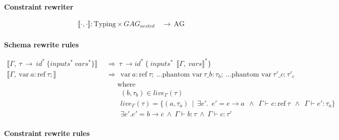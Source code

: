 
\begin{figure*}

\begin{center}

\textbf{Constraint rewriter}

\begin{align*}
\llbracket \cdot, \cdot \rrbracket : \text{Typing} \times GAG_{nested} & ~~\rightarrow~~ \text{AG}\\
\end{align*}

\textbf{Schema rewrite rules}

\begin{align*}
\llbracket \Gamma, ~\tau~ \rightarrow ~ id^{*} ~ \{ inputs^{*} ~ vars^{*} \}\rrbracket & ~~ \Rightarrow ~ \tau ~ \rightarrow id^{*} ~  \{  ~inputs^{*} ~ ~\llbracket \Gamma, ~ vars \rrbracket^{*}\} \\
\llbracket \Gamma, ~ \text{var} ~ a : \text{ref} ~ \tau;\rrbracket & ~~ \Rightarrow ~~
\text{var} ~ a : \text{ref} ~ \tau;  ~\ldots \text{phantom var} ~ \tau\_b : \tau_b; ~ \ldots \text{phantom var}~ \tau'\_c : \tau'_c \\
& ~~~~~~~ ~~\text{where} \\
& ~~~~~~~ ~~~~ (b,\tau_b) \in live_\Gamma(\tau) \\
& ~~~~~~~ ~~~~ live_{\Gamma}(\tau) = \{ (a, \tau_a) ~~|~~ \exists e' . ~~ e' = e \rightarrow a ~~ \wedge ~~ \Gamma \vdash e : \text{ref}~\tau ~~\wedge~~ \Gamma \vdash e' : \tau_a \}\\
& ~~~~~~~ ~~~~ \exists e' . e' = b \rightarrow c ~ \wedge ~ \Gamma \vdash b : \tau ~ \wedge ~ \Gamma \vdash c : \tau' \\
\end{align*}

\textbf{Constraint rewrite rules}


\end{center}
\end{figure*}
